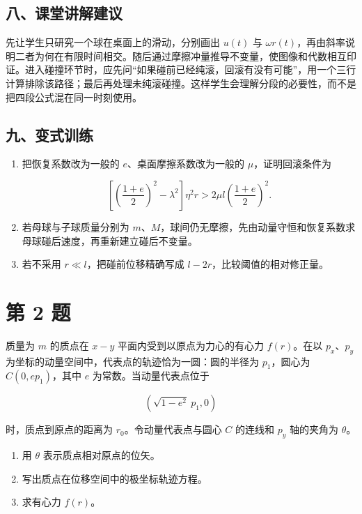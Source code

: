 \documentclass[12pt,a4paper,UTF8]{ctexart}
\newcommand{\tightlist}{\setlength{\itemsep}{0pt}\setlength{\parskip}{0pt}}
\begin{document}
\subsection{八、课堂讲解建议}\label{ux516bux8bfeux5802ux8bb2ux89e3ux5efaux8bae}

先让学生只研究一个球在桌面上的滑动，分别画出 \(u(t)\) 与
\(\omega r(t)\)，再由斜率说明二者为何在有限时间相交。随后通过摩擦冲量推导不变量，使图像和代数相互印证。进入碰撞环节时，应先问``如果碰前已经纯滚，回滚有没有可能''，用一个三行计算排除该路径；最后再处理未纯滚碰撞。这样学生会理解分段的必要性，而不是把四段公式混在同一时刻使用。

\subsection{九、变式训练}\label{ux4e5dux53d8ux5f0fux8badux7ec3}

\begin{enumerate}
\def\labelenumi{\arabic{enumi}.}
\item
  把恢复系数改为一般的 \(e\)、桌面摩擦系数改为一般的
  \(\mu\)，证明回滚条件为

  \[\left[\left(\frac{1+e}{2}\right)^2-\lambda^2\right]\eta^2r>
  2\mu l\left(\frac{1+e}{2}\right)^2.\]
\item
  若母球与子球质量分别为
  \(m\)、\(M\)，球间仍无摩擦，先由动量守恒和恢复系数求母球碰后速度，再重新建立碰后不变量。
\item
  若不采用 \(r\ll l\)，把碰前位移精确写成
  \(l-2r\)，比较阈值的相对修正量。
\end{enumerate}

\newpage

\section{第 2 题}\label{ux7b2c-2-ux9898}

质量为 \(m\) 的质点在 \(x-y\) 平面内受到以原点为力心的有心力
\(f(r)\)。在以 \(p_x\)、\(p_y\)
为坐标的动量空间中，代表点的轨迹恰为一圆：圆的半径为 \(p_1\)，圆心为
\(C(0,ep_1)\)，其中 \(e\) 为常数。当动量代表点位于

\[\left(\sqrt{1-e^2}\ p_1,0\right)\]

时，质点到原点的距离为 \(r_0\)。令动量代表点与圆心 \(C\) 的连线和
\(p_y\) 轴的夹角为 \(\theta\)。

\begin{enumerate}
\def\labelenumi{\arabic{enumi}.}
\tightlist
\item
  用 \(\theta\) 表示质点相对原点的位矢。
\item
  写出质点在位移空间中的极坐标轨迹方程。
\item
  求有心力 \(f(r)\)。
\end{enumerate}
\end{document}
